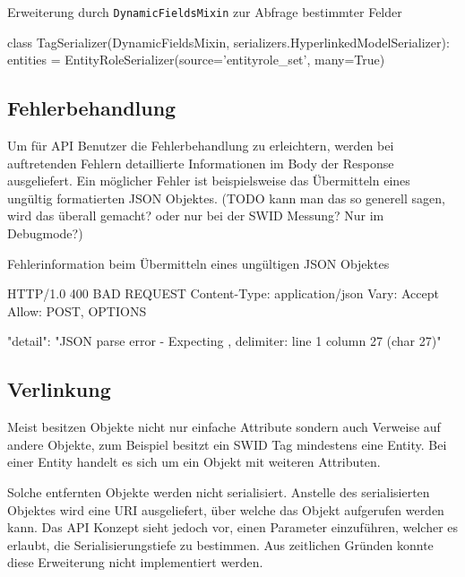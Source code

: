 \begin{listing}
\caption{Erweiterung durch \texttt{DynamicFieldsMixin} zur Abfrage bestimmter Felder}
\label{api:tagserializer}
\begin{pythoncode}
class TagSerializer(DynamicFieldsMixin, serializers.HyperlinkedModelSerializer):
    entities = EntityRoleSerializer(source='entityrole_set', many=True)
\end{pythoncode}
\end{listing}

\subsection{Fehlerbehandlung}
Um für API Benutzer die Fehlerbehandlung zu erleichtern, werden bei auftretenden
Fehlern detaillierte Informationen im Body der Response ausgeliefert. Ein
möglicher Fehler ist beispielsweise das Übermitteln eines ungültig formatierten
JSON Objektes. (TODO kann man das so generell sagen, wird das überall gemacht?
oder nur bei der SWID Messung? Nur im Debugmode?)

\begin{listing}
\caption{Fehlerinformation beim Übermitteln eines ungültigen JSON Objektes}
\begin{httpcode}
HTTP/1.0 400 BAD REQUEST
Content-Type: application/json
Vary: Accept
Allow: POST, OPTIONS

{
    "detail": "JSON parse error - Expecting , delimiter: line 1 column 27 (char 27)"
}
\end{httpcode}
\end{listing}

\subsection{Verlinkung}
Meist besitzen Objekte nicht nur einfache Attribute sondern auch Verweise auf
andere Objekte, zum Beispiel besitzt ein SWID Tag mindestens eine Entity. Bei
einer Entity handelt es sich um ein Objekt mit weiteren Attributen.

Solche entfernten Objekte werden nicht serialisiert. Anstelle des serialisierten
Objektes wird eine URI ausgeliefert, über welche das Objekt aufgerufen werden
kann. Das API Konzept sieht jedoch vor, einen Parameter einzuführen, welcher es
erlaubt, die Serialisierungstiefe zu bestimmen. Aus zeitlichen Gründen konnte
diese Erweiterung nicht implementiert werden.

